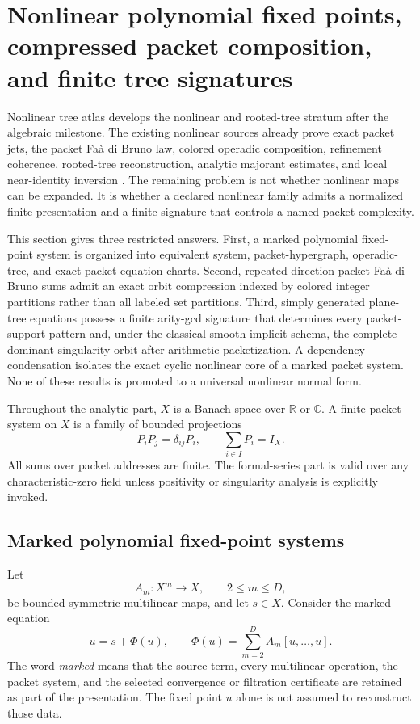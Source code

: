 \section{Nonlinear polynomial fixed points, compressed packet composition, and finite tree signatures}
\label{sec:block11-nonlinear-tree}

Nonlinear tree atlas develops the nonlinear and rooted-tree stratum after the algebraic milestone.  The existing nonlinear sources already prove exact packet jets, the packet Fa\`a di Bruno law, colored operadic composition, refinement coherence, rooted-tree reconstruction, analytic majorant estimates, and local near-identity inversion \cite{P3,RT,NLO}.  The remaining problem is not whether nonlinear maps can be expanded.  It is whether a declared nonlinear family admits a normalized finite presentation and a finite signature that controls a named packet complexity.

This section gives three restricted answers.  First, a marked polynomial fixed-point system is organized into equivalent system, packet-hypergraph, operadic-tree, and exact packet-equation charts.  Second, repeated-direction packet Fa\`a di Bruno sums admit an exact orbit compression indexed by colored integer partitions rather than all labeled set partitions.  Third, simply generated plane-tree equations possess a finite arity-gcd signature that determines every packet-support pattern and, under the classical smooth implicit schema, the complete dominant-singularity orbit after arithmetic packetization.  A dependency condensation isolates the exact cyclic nonlinear core of a marked packet system.  None of these results is promoted to a universal nonlinear normal form.

Throughout the analytic part, $X$ is a Banach space over $\mathbb R$ or $\mathbb C$.  A finite packet system on $X$ is a family of bounded projections
\[
 P_iP_j=\delta_{ij}P_i,
 \qquad
 \sum_{i\in I}P_i=I_X.
\]
All sums over packet addresses are finite.  The formal-series part is valid over any characteristic-zero field unless positivity or singularity analysis is explicitly invoked.

\subsection{Marked polynomial fixed-point systems}
\label{subsec:block11-marked-systems}

Let
\[
 A_m:X^m\longrightarrow X,
 \qquad 2\le m\le D,
\]
be bounded symmetric multilinear maps, and let $s\in X$.  Consider the marked equation
\[
 \boxed{
 u=s+\Phi(u),
 \qquad
 \Phi(u)=\sum_{m=2}^{D}A_m[u,\ldots,u].}
 \tag{11.1}
\]
The word \emph{marked} means that the source term, every multilinear operation, the packet system, and the selected convergence or filtration certificate are retained as part of the presentation.  The fixed point $u$ alone is not assumed to reconstruct those data.

